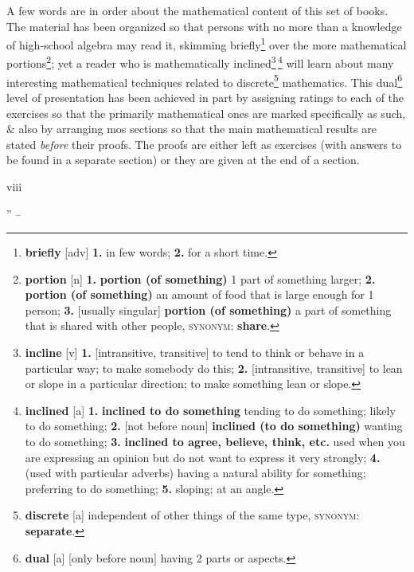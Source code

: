\documentclass[oneside]{book}
\numberwithin{equation}{section}
\begin{document}
A few words are in order about the mathematical content of this set of books. The material has been organized so that persons with no more than a knowledge of high-school algebra may read it, skimming briefly\footnote{\textbf{briefly} [adv] \textbf{1.} in few words; \textbf{2.} for a short time.} over the more mathematical portions\footnote{\textbf{portion} [n] \textbf{1.} \textbf{portion (of something)} 1 part of something larger; \textbf{2.} \textbf{portion (of something)} an amount of food that is large enough for 1 person; \textbf{3.} [usually singular] \textbf{portion (of something)} a part of something that is shared with other people, \textsc{synonym}: \textbf{share}.}; yet a reader who is mathematically inclined\footnote{\textbf{incline} [v] \textbf{1.} [intransitive, transitive] to tend to think or behave in a particular way; to make somebody do this; \textbf{2.} [intransitive, transitive] to lean or slope in a particular direction; to make something lean or slope.}\,\footnote{\textbf{inclined} [a] \textbf{1.} \textbf{inclined to do something} tending to do something; likely to do something; \textbf{2.} [not before noun] \textbf{inclined (to do something)} wanting to do something; \textbf{3.} \textbf{inclined to agree, believe, think, etc.} used when you are expressing an opinion but do not want to express it very strongly; \textbf{4.} (used with particular adverbs) having a natural ability for something; preferring to do something; \textbf{5.} sloping; at an angle.} will learn about many interesting mathematical techniques related to discrete\footnote{\textbf{discrete} [a] independent of other things of the same type, \textsc{synonym}: \textbf{separate}.} mathematics. This dual\footnote{\textbf{dual} [a] [only before noun] having 2 parts or aspects.} level of presentation has been achieved in part by assigning ratings to each of the exercises so that the primarily mathematical ones are marked specifically as such, \& also by arranging mos sections so that the main mathematical results are stated \textit{before} their proofs. The proofs are either left as exercises (with answers to be found in a separate section) or they are given at the end of a section.

viii

'' -- \cite[Preface, pp. v--]{Knuth1997}




\printbibliography[heading=bibintoc]
	
\end{document}

